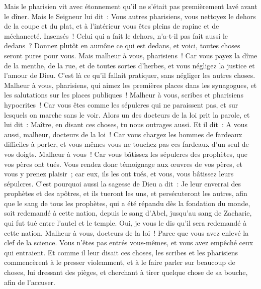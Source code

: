 \begin{multicols}{2}
Mais le pharisien vit avec étonnement qu'il ne s'était pas premièrement lavé avant le dîner.
Mais le Seigneur lui dit~: Vous autres pharisiens, vous nettoyez le dehors de la coupe et du plat, et à l'intérieur vous êtes pleins de rapine et de méchanceté.
Insensés~! Celui qui a fait le dehors, n'a-t-il pas fait aussi le dedans~?
Donnez plutôt en aumône ce qui est dedans, et voici, toutes choses seront pures pour vous.
Mais malheur à vous, pharisiens~! Car vous payez la dîme de la menthe, de la rue, et de toutes sortes d'herbes, et vous négligez la justice et l'amour de Dieu. C'est là ce qu'il fallait pratiquer, sans négliger les autres choses.
Malheur à vous, pharisiens, qui aimez les premières places dans les synagogues, et les salutations sur les places publiques~!
Malheur à vous, scribes et pharisiens hypocrites~! Car vous êtes comme les sépulcres qui ne paraissent pas, et sur lesquels on marche sans le voir.
Alors un des docteurs de la loi prit la parole, et lui dit~: Maître, en disant ces choses, tu nous outrages aussi.
Et il dit~: A vous aussi, malheur, docteurs de la loi~! Car vous chargez les hommes de fardeaux difficiles à porter, et vous-mêmes vous ne touchez pas ces fardeaux d'un seul de vos doigts.
Malheur à vous~! Car vous bâtissez les sépulcres des prophètes, que vos pères ont tués.
Vous rendez donc témoignage aux œuvres de vos pères, et vous y prenez plaisir~; car eux, ils les ont tués, et vous, vous bâtissez leurs sépulcres.
C'est pourquoi aussi la sagesse de Dieu a dit~: Je leur enverrai des prophètes et des apôtres, et ils tueront les uns, et persécuteront les autres,
afin que le sang de tous les prophètes, qui a été répandu dès la fondation du monde, soit redemandé à cette nation,
depuis le sang d'Abel, jusqu'au sang de Zacharie, qui fut tué entre l'autel et le temple. Oui, je vous le dis qu'il sera redemandé à cette nation.
Malheur à vous, docteurs de la loi~! Parce que vous avez enlevé la clef de la science. Vous n'êtes pas entrés vous-mêmes, et vous avez empêché ceux qui entraient.
Et comme il leur disait ces choses, les scribes et les pharisiens commencèrent à le presser violemment, et à le faire parler sur beaucoup de choses,
lui dressant des pièges, et cherchant à tirer quelque chose de sa bouche, afin de l'accuser.

\end{multicols}
